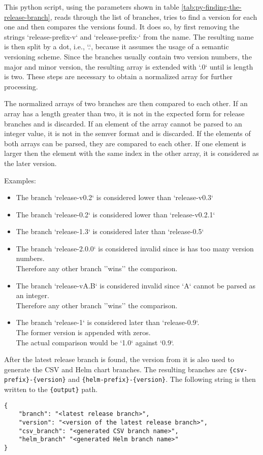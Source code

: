 This python script, using the parameters shown in table \ref{tab:py-finding-the-release-branch}, reads through the list of branches, tries to find a version for each one and then compares the versions found.
It does so, by first removing the strings `{release-prefix}-v` and `{release-prefix}-` from the name.
The resulting name is then split by a dot, i.e., `.`, because it assumes the usage of a semantic versioning scheme.
Since the branches usually contain two version numbers, the major and minor version, the resulting array is extended with `.0` until is length is two.
These steps are necessary to obtain a normalized array for further processing.

The normalized arrays of two branches are then compared to each other.
If an array has a length greater than two, it is not in the expected form for release branches and is discarded.
If an element of the array cannot be parsed to an integer value, it is not in the semver format and is discarded.
If the elements of both arrays can be parsed, they are compared to each other.
If one element is larger then the element with the same index in the other array, it is considered as the later version.

Examples:
\begin{itemize}
    \item The branch `release-v0.2` is considered lower than `release-v0.3`
    \item The branch `release-0.2`  is considered lower than `release-v0.2.1`
    \item The branch `release-1.3` is considered later than `release-0.5`
    \item The branch `release-2.0.0` is considered invalid since is has too many version numbers. \\ Therefore any other branch ''wins'' the comparison.
    \item The branch `release-vA.B` is considered invalid since `A` cannot be parsed as an integer. \\ Therefore any other branch ''wins'' the comparison.
    \item The branch `release-1` is considered later than `release-0.9`. \\ The former version is appended with zeros. \\ The actual comparison would be `1.0` against `0.9`.
\end{itemize}

After the latest release branch is found, the version from it is also used to generate the CSV and Helm chart branches.
The resulting branches are \verb`{csv-prefix}-{version}` and \verb`{helm-prefix}-{version}`.
The following string is then written to the \verb`{output}` path.

\begin{verbatim}
{
    "branch": "<latest release branch>",
    "version": "<version of the latest release branch>",
    "csv_branch": "<generated CSV branch name>",
    "helm_branch" "<generated Helm branch name>"
}
\end{verbatim}
